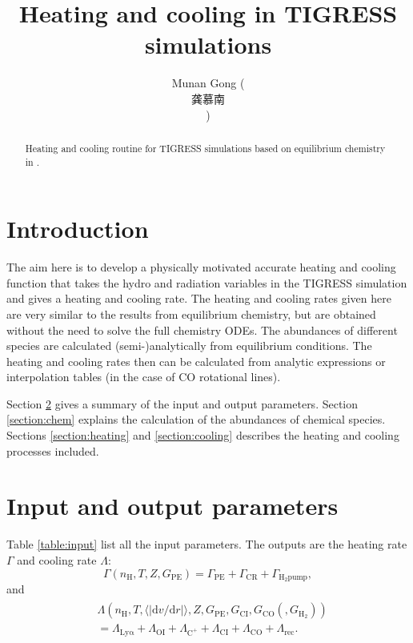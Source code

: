 \documentclass[iop,numberedappendix]{emulateapj}
\newcommand{\di}{\mathrm{d}}
\newcommand{\mr}{\mathrm}
\newcommand{\Ht}{\mathrm{H_2}}
\newcommand{\Ho}{\mathrm{H}}
\newcommand{\CO}{\mathrm{CO}}
\newcommand{\CI}{\mathrm{CI}}
\newcommand{\OI}{\mathrm{OI}}
\newcommand{\Cplus}{\mathrm{C^+}}
\begin{document}
\title{Heating and cooling in TIGRESS simulations}
\author{Munan Gong (\begin{CJK*}{UTF8}{gbsn}龚慕南\end{CJK*})}

\begin{abstract}
    Heating and cooling routine for TIGRESS simulations \citep{KO2017}
    based on equilibrium chemistry in \citep{GOW2016}.
\end{abstract}

\section{Introduction}
The aim here is to develop a physically motivated accurate 
heating and cooling function
that takes the hydro and radiation variables in the TIGRESS simulation and
gives a heating and cooling rate. The heating and cooling rates given here 
are very similar to the results from equilibrium chemistry, but are
obtained without the need to solve the full chemistry ODEs. The abundances of
different species are calculated (semi-)analytically from equilibrium conditions.
The heating and cooling rates then can be calculated from analytic expressions
or interpolation tables (in the case of $\CO$ rotational lines).

Section \ref{section:para} gives a summary of the input and output parameters.
Section \ref{section:chem} explains the calculation of the
abundances of chemical species. Sections \ref{section:heating} and
\ref{section:cooling} describes the heating and cooling processes included.

\section{Input and output parameters}\label{section:para}
Table \ref{table:input} list all the input parameters. The outputs are the
heating rate $\Gamma$ and cooling rate $\Lambda$:
\begin{equation}\label{eq:heating}
    \Gamma(n_\Ho, T, Z, G_\mr{PE}) = \Gamma_\mr{PE} + \Gamma_\mr{CR} +
    \Gamma_\mr{H_2 pump},
\end{equation}
and
\begin{align}\label{eq:cooling}
    \begin{split}
    &\Lambda(n_\Ho, T, \langle |\di v/\di r| \rangle, Z, G_\mr{PE},  G_\CI,
    G_\CO(,G_\Ht)) \\
    &= \Lambda_\mr{Ly\alpha}+\Lambda_\OI + \Lambda_\Cplus +
    \Lambda_\CI + \Lambda_\CO + \Lambda_\mr{rec}.
    \end{split}
\end{align}
\end{document}
